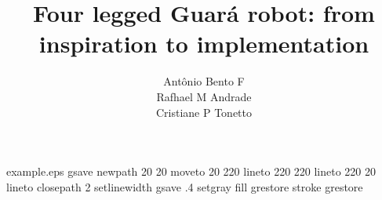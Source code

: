 %
%
%
%
%
\begin{filecontents*}{example.eps}
gsave
newpath
  20 20 moveto
  20 220 lineto
  220 220 lineto
  220 20 lineto
closepath
2 setlinewidth
gsave
  .4 setgray fill
grestore
stroke
grestore
\end{filecontents*}
%
\RequirePackage{fix-cm}
%
\documentclass[smallextended]{svjour3}       %
%
\smartqed  %
%
\usepackage{graphicx}
\usepackage{subfigure}
\usepackage{amsmath}
\usepackage[center]{caption}
\usepackage{cite}
\usepackage{xcolor}
%
%
%
%
%


\title{Four legged Guar\'a robot: from inspiration to implementation%
}


\author{Ant\^onio Bento F \\ %
        Rafhael M Andrade \\	%
        Cristiane P Tonetto	%
}

